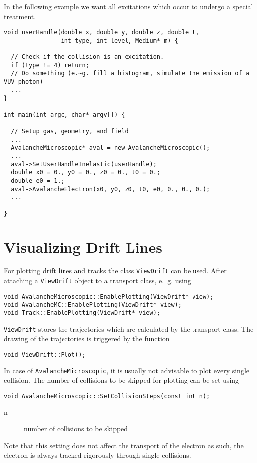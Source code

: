 In the following example we want 
all excitations which occur to undergo a special treatment. 
\begin{lstlisting}
void userHandle(double x, double y, double z, double t,
                int type, int level, Medium* m) {

  // Check if the collision is an excitation.
  if (type != 4) return;
  // Do something (e.~g. fill a histogram, simulate the emission of a VUV photon) 
  ...
} 

int main(int argc, char* argv[]) {

  // Setup gas, geometry, and field
  ...
  AvalancheMicroscopic* aval = new AvalancheMicroscopic();
  ...
  aval->SetUserHandleInelastic(userHandle);
  double x0 = 0., y0 = 0., z0 = 0., t0 = 0.;
  double e0 = 1.;
  aval->AvalancheElectron(x0, y0, z0, t0, e0, 0., 0., 0.); 
  ...

}

\end{lstlisting}
 
\section{Visualizing Drift Lines}

For plotting drift lines and tracks the class \texttt{ViewDrift} can be used. 
After attaching a \texttt{ViewDrift} object to a transport class, e.~g. using
\begin{lstlisting}
void AvalancheMicroscopic::EnablePlotting(ViewDrift* view);
void AvalancheMC::EnablePlotting(ViewDrift* view);
void Track::EnablePlotting(ViewDrift* view);
\end{lstlisting}
\texttt{ViewDrift} stores the trajectories which are calculated by the 
transport class. 
The drawing of the trajectories is triggered by the function
\begin{lstlisting}
void ViewDrift::Plot();
\end{lstlisting}

In case of \texttt{AvalancheMicroscopic}, it is usually not advisable to 
plot every single collision. The number of collisions 
to be skipped for plotting can be set using
\begin{lstlisting}
void AvalancheMicroscopic::SetCollisionSteps(const int n);
\end{lstlisting}
\begin{description}
  \item[n] number of collisions to be skipped
\end{description}
Note that this setting does not affect the transport of the electron as such, 
the electron is always tracked rigorously through single collisions.
